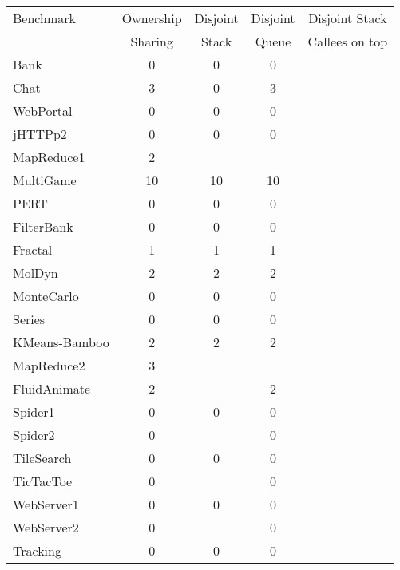 \documentclass{amsart}[9pt]
\begin{document}
\begin{tabular}{|l|c|c|c|c|}
\hline
Benchmark     & Ownership & Disjoint & Disjoint & Disjoint Stack \\
              & Sharing   & Stack    & Queue    & Callees on top \\
\hline
Bank          & 0         & 0                 & 0             &         \\
Chat          & 3         & 0                 & 3             &         \\
WebPortal     & 0         & 0                 & 0             &         \\
jHTTPp2       & 0         & 0                 & 0             &         \\
MapReduce1    & 2         & \color{red}{1}    & \color{red}{1}&         \\
MultiGame     & 10        & 10                & 10            &         \\
PERT          & 0         & 0                 & 0             &         \\
FilterBank    & 0         & 0                 & 0             &         \\
Fractal       & 1         & 1                 & 1             &         \\
MolDyn        & 2         & 2                 & 2             &         \\
MonteCarlo    & 0         & 0                 & 0             &         \\
Series        & 0         & 0                 & 0             &         \\
KMeans-Bamboo & 2         & 2                 & 2             &         \\
MapReduce2    & 3         & \color{red}{0}    & \color{red}{0}&         \\
FluidAnimate  & 2         & \color{red}{error}& 2             &         \\
Spider1       & 0         & 0                 & 0             &         \\
Spider2       & 0         & \color{red}{error}& 0             &         \\
TileSearch    & 0         & 0                 & 0             &         \\
TicTacToe     & 0         & \color{red}{error}& 0             &         \\
WebServer1    & 0         & 0                 & 0             &         \\
WebServer2    & 0         & \color{red}{error}& 0             &         \\
Tracking      & 0         & 0                 & 0             &         \\
\hline
\end{tabular}
\end{document}
